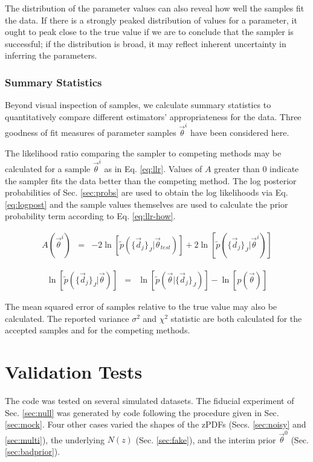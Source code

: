 \documentclass[preprint]{aastex}
\begin{document}
The distribution of the parameter values can also reveal how well the samples fit the data.  If there is a strongly peaked distribution of values for a parameter, it ought to peak close to the true value if we are to conclude that the sampler is successful; if the distribution is broad, it may reflect inherent uncertainty in inferring the parameters.

\clearpage
\subsubsection{Summary Statistics}
\label{sec:stats}

Beyond visual inspection of samples, we calculate summary statistics to quantitatively compare different estimators' appropriateness for the data.  Three goodness of fit measures of parameter samples $\vec{\theta}^{i}$  have been considered here.  

The likelihood ratio comparing the sampler to competing methods may be calculated for a sample $\vec{\theta}^{i}$ as in Eq. \ref{eq:llr}.  Values of $A$ greater than 0 indicate the sampler fits the data better than the competing method.  The log posterior probabilities of Sec. \ref{sec:probs} are used to obtain the log likelihoods via Eq. \ref{eq:logpost} and the sample values themselves are used to calculate the prior probability term according to Eq. \ref{eq:llr-how}.

\begin{eqnarray}
\label{eq:llr}
A(\vec{\theta}^{i}) &=& -2\ln[\tilde{p}(\{\vec{d}_{j}\}_{J}|\vec{\theta}_{test})]+2\ln[\tilde{p}(\{\vec{d}_{j}\}_{J}|\vec{\theta}^{i})]
\end{eqnarray}

\begin{eqnarray}
\label{eq:llr-how}
\ln[\tilde{p}(\{\vec{d}_{j}\}_{J}|\vec{\theta})] &=& \ln[\tilde{p}(\vec{\theta}|\{\vec{d}_{j}\}_{J})]-\ln[p(\vec{\theta})]
\end{eqnarray}

The mean squared error of samples relative to the true value may also be calculated.  The reported variance $\sigma^{2}$ and $\chi^{2}$ statistic are both calculated for the accepted samples and for the competing methods.

\clearpage
\section{Validation Tests}
\label{sec:valid}

The code was tested on several simulated datasets.  The fiducial experiment of Sec. \ref{sec:null} was generated by code following the procedure given in Sec. \ref{sec:mock}.  Four other cases varied the shapes of the zPDFs (Secs. \ref{sec:noisy} and \ref{sec:multi}), the underlying $N(z)$ (Sec. \ref{sec:fake}), and the interim prior $\vec{\theta}^{0}$ (Sec. \ref{sec:badprior}).  
\end{document}
